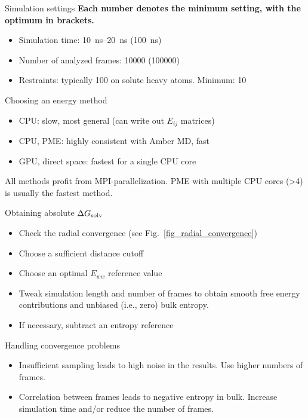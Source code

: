 \documentclass[9pt,tutorial]{livecoms}
\begin{document}
\begin{Checklists}[H]
	
	\begin{checklist}{Simulation settings}
		\textbf{Each number denotes the minimum setting, with the optimum in brackets.}
		\begin{itemize}
			\item Simulation time: \SIrange{10}{20}{\nano\second} (\SI{100}{\nano\second})
			\item Number of analyzed frames: \num{10000} (\num{100000})
			\item Restraints: typically \SI{100}{\kcalPerMolASqr} on solute heavy atoms. Minimum: \SI{10}{\kcalPerMolASqr}
		\end{itemize}
	\end{checklist}
	
	\begin{checklist}{Choosing an energy method}
		\begin{itemize}
			\item CPU: slow, most general (can write out $E_{ij}$ matrices)
			\item CPU, PME: highly consistent with Amber MD, fast
			\item GPU, direct space: fastest for a single CPU core
		\end{itemize}
	   
	All methods profit from MPI-parallelization.   
	PME with multiple CPU cores (>4) is usually the fastest method.
	\end{checklist}
	
	\begin{checklist}{Obtaining absolute $\Delta G_\textup{solv}$}
		\begin{itemize}
			\item Check the radial convergence (see Fig.~\ref{fig_radial_convergence})
			\item Choose a sufficient distance cutoff
			\item Choose an optimal $E_{ww}$ reference value
			\item Tweak simulation length and number of frames to obtain smooth free energy contributions and unbiased (i.e., zero) bulk entropy.
			\item If necessary, subtract an entropy reference
		\end{itemize}
	\end{checklist}
	
	\begin{checklist}{Handling convergence problems}
		\begin{itemize}
			\item Insufficient sampling leads to high noise in the results. Use higher numbers of frames.
			\item Correlation between frames leads to negative entropy in bulk. Increase simulation time and/or reduce the number of frames.
		\end{itemize}
	\end{checklist}
	

\end{Checklists}
\end{document}

